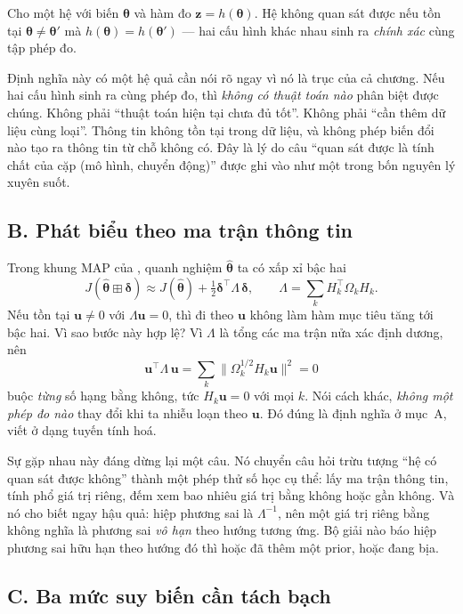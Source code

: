\documentclass[../../vslam.tex]{subfiles}
\begin{document}
Cho một hệ với biến \(\boldsymbol{\theta}\) và hàm đo \(\mathbf{z} = h(\boldsymbol{\theta})\). Hệ không quan sát được nếu tồn tại \(\boldsymbol{\theta} \neq \boldsymbol{\theta}'\) mà \(h(\boldsymbol{\theta}) = h(\boldsymbol{\theta}')\) --- hai cấu hình khác nhau sinh ra \emph{chính xác} cùng tập phép đo.

Định nghĩa này có một hệ quả cần nói rõ ngay vì nó là trục của cả chương. Nếu hai cấu hình sinh ra cùng phép đo, thì \emph{không có thuật toán nào} phân biệt được chúng. Không phải ``thuật toán hiện tại chưa đủ tốt''. Không phải ``cần thêm dữ liệu cùng loại''. Thông tin không tồn tại trong dữ liệu, và không phép biến đổi nào tạo ra thông tin từ chỗ không có. Đây là lý do câu ``quan sát được là tính chất của cặp (mô hình, chuyển động)'' được ghi vào  như một trong bốn nguyên lý xuyên suốt.

\subsection{B. Phát biểu theo ma trận thông tin}

Trong khung MAP của , quanh nghiệm \(\hat{\boldsymbol{\theta}}\) ta có xấp xỉ bậc hai
\[
J(\hat{\boldsymbol{\theta}} \boxplus \boldsymbol{\delta}) \approx J(\hat{\boldsymbol{\theta}}) + \tfrac12 \boldsymbol{\delta}^{\top}\Lambda\,\boldsymbol{\delta},
\qquad \Lambda = \sum_k H_k^{\top}\Omega_k H_k .
\]
Nếu tồn tại \(\mathbf{u}\neq 0\) với \(\Lambda\mathbf{u} = 0\), thì đi theo \(\mathbf{u}\) không làm hàm mục tiêu tăng tới bậc hai. Vì sao bước này hợp lệ? Vì \(\Lambda\) là tổng các ma trận nửa xác định dương, nên
\[
\mathbf{u}^{\top}\Lambda\,\mathbf{u} = \sum_k \bigl\|\Omega_k^{1/2}H_k\mathbf{u}\bigr\|^2 = 0
\]
buộc \emph{từng} số hạng bằng không, tức \(H_k\mathbf{u} = 0\) với mọi \(k\). Nói cách khác, \emph{không một phép đo nào} thay đổi khi ta nhiễu loạn theo \(\mathbf{u}\). Đó đúng là định nghĩa ở mục~A, viết ở dạng tuyến tính hoá.

Sự gặp nhau này đáng dừng lại một câu. Nó chuyển câu hỏi trừu tượng ``hệ có quan sát được không'' thành một phép thử số học cụ thể: lấy ma trận thông tin, tính phổ giá trị riêng, đếm xem bao nhiêu giá trị bằng không hoặc gần không. Và nó cho biết ngay hậu quả: hiệp phương sai là \(\Lambda^{-1}\), nên một giá trị riêng bằng không nghĩa là phương sai \emph{vô hạn} theo hướng tương ứng. Bộ giải nào báo hiệp phương sai hữu hạn theo hướng đó thì hoặc đã thêm một prior, hoặc đang bịa.

\subsection{C. Ba mức suy biến cần tách bạch}
\end{document}
